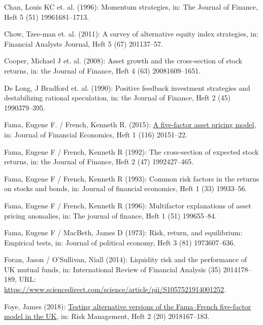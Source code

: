 \documentclass[a4paper,12pt]{article}
\begin{document}
\begin{CSLReferences}{1}{0}
\leavevmode{}%
Chan, Louis KC et. al. (1996): Momentum strategies, in: The Journal of Finance, Heft 5 (51) 19961681--1713.

\leavevmode{}%
Chow, Tzee-man et. al. (2011): A survey of alternative equity index strategies, in: Financial Analysts Journal, Heft 5 (67) 201137--57.

\leavevmode{}%
Cooper, Michael J et. al. (2008): Asset growth and the cross‐section of stock returns, in: the Journal of Finance, Heft 4 (63) 20081609--1651.

\leavevmode{}%
De Long, J Bradford et. al. (1990): Positive feedback investment strategies and destabilizing rational speculation, in: the Journal of Finance, Heft 2 (45) 1990379--395.

\leavevmode{}%
Fama, Eugene F. / French, Kenneth R. (2015): \href{https://doi.org/10.1016/j.jfineco.2014.10.010}{A five-factor asset pricing model}, in: Journal of Financial Economics, Heft 1 (116) 20151--22.

\leavevmode{}%
Fama, Eugene F / French, Kenneth R (1992): The cross‐section of expected stock returns, in: the Journal of Finance, Heft 2 (47) 1992427--465.

\leavevmode{}%
Fama, Eugene F / French, Kenneth R (1993): Common risk factors in the returns on stocks and bonds, in: Journal of financial economics, Heft 1 (33) 19933--56.

\leavevmode{}%
Fama, Eugene F / French, Kenneth R (1996): Multifactor explanations of asset pricing anomalies, in: The journal of finance, Heft 1 (51) 199655--84.

\leavevmode{}%
Fama, Eugene F / MacBeth, James D (1973): Risk, return, and equilibrium: Empirical tests, in: Journal of political economy, Heft 3 (81) 1973607--636.

\leavevmode{}%
Foran, Jason / O'Sullivan, Niall (2014): Liquidity risk and the performance of UK mutual funds, in: International Review of Financial Analysis (35) 2014178--189, URL: \url{https://www.sciencedirect.com/science/article/pii/S1057521914001252}.

\leavevmode{}%
Foye, James (2018): \href{https://doi.org/10.1057/s41283-018-0034-3}{Testing alternative versions of the Fama--French five-factor model in the UK}, in: Risk Management, Heft 2 (20) 2018167--183.


\end{CSLReferences}
\end{document}
